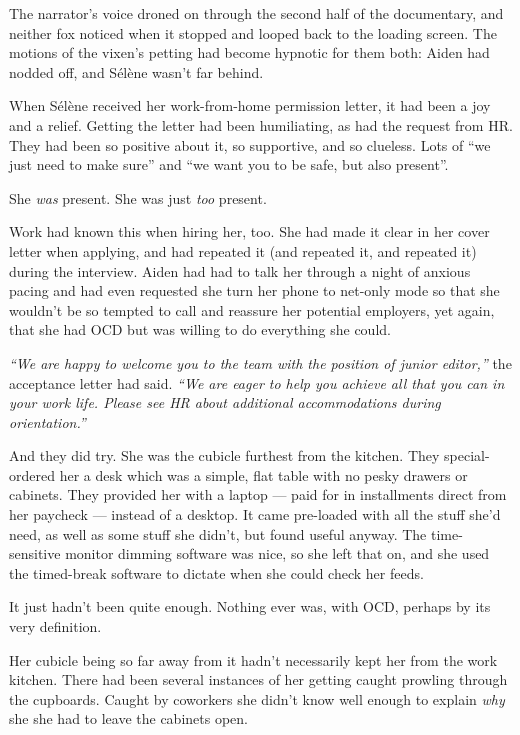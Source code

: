 The narrator's voice droned on through the second half of the documentary, and neither fox noticed when it stopped and looped back to the loading screen. The motions of the vixen's petting had become hypnotic for them both: Aiden had nodded off, and Sélène wasn't far behind.

\secdiv{}

\noindent When Sélène received her work-from-home permission letter, it had been a joy and a relief. Getting the letter had been humiliating, as had the request from HR. They had been so positive about it, so supportive, and so clueless. Lots of ``we just need to make sure'' and ``we want you to be safe, but also present''.

She \emph{was} present. She was just \emph{too} present.

Work had known this when hiring her, too. She had made it clear in her cover letter when applying, and had repeated it (and repeated it, and repeated it) during the interview. Aiden had had to talk her through a night of anxious pacing and had even requested she turn her phone to net-only mode so that she wouldn't be so tempted to call and reassure her potential employers, yet again, that she had OCD but was willing to do everything she could.

\emph{``We are happy to welcome you to the team with the position of junior editor,''} the acceptance letter had said. \emph{``We are eager to help you achieve all that you can in your work life. Please see HR about additional accommodations during orientation.''}

And they did try. She was the cubicle furthest from the kitchen. They special-ordered her a desk which was a simple, flat table with no pesky drawers or cabinets. They provided her with a laptop --- paid for in installments direct from her paycheck --- instead of a desktop. It came pre-loaded with all the stuff she'd need, as well as some stuff she didn't, but found useful anyway. The time-sensitive monitor dimming software was nice, so she left that on, and she used the timed-break software to dictate when she could check her feeds.

It just hadn't been quite enough. Nothing ever was, with OCD, perhaps by its very definition.

Her cubicle being so far away from it hadn't necessarily kept her from the work kitchen. There had been several instances of her getting caught prowling through the cupboards. Caught by coworkers she didn't know well enough to explain \emph{why} she she had to leave the cabinets open.

